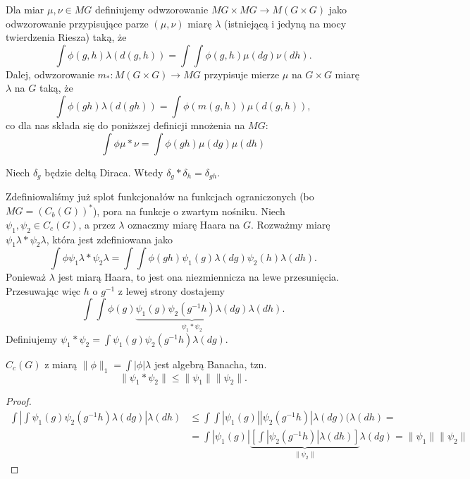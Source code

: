 Dla miar $\mu,\nu\in MG$ definiujemy odwzorowanie $MG\times MG\to M(G\times G)$ jako odwzorowanie przypisujące parze $(\mu,\nu)$ miarę $\lambda$ (istniejącą i jedyną na mocy twierdzenia Riesza) taką, że
$$\int \phi(g,h) \lambda(d(g,h))=\int\int \phi(g, h)\mu(dg)\nu(dh).$$
Dalej, odwzorowanie $m_*:M(G\times G)\to MG$ przypisuje mierze $\mu$ na $G\times G$ miarę $\lambda$ na $G$ taką, że 
$$\int \phi(gh)\lambda(d(gh))=\int \phi(m(g,h))\mu(d(g,h)),$$
co dla nas składa się do poniższej definicji mnożenia na $MG$:
$$\int \phi\mu\ast\nu=\int \phi(gh)\mu(dg)\mu(dh)$$

\begin{example}
  Niech $\delta_g$ będzie deltą Diraca. Wtedy $\delta_g\ast\delta_h=\delta_{gh}$.
\end{example}

Zdefiniowaliśmy już splot funkcjonałów na funkcjach ograniczonych (bo $MG=(C_b(G))^*$), pora na funkcje o zwartym nośniku. Niech $\psi_1,\psi_2\in C_c(G)$, a przez $\lambda$ oznaczmy miarę Haara na $G$. Rozważmy miarę $\psi_1\lambda\ast\psi_2\lambda$, która jest zdefiniowana jako
$$\int\phi\psi_1\lambda\ast\psi_2\lambda=\int\int\phi(gh)\psi_1(g)\lambda(dg)\psi_2(h)\lambda(dh).$$
Ponieważ $\lambda$ jest miarą Haara, to jest ona niezmiennicza na lewe przesunięcia. Przesuwając więc $h$ o $g^{-1}$ z lewej strony dostajemy
$$\int\int\phi(g) \underbrace{\psi_1(g)\psi_2(g^{-1}h)\lambda(dg)}_{\psi_1\ast\psi_2}\lambda(dh).$$
Definiujemy $\psi_1\ast\psi_2=\int \psi_1(g)\psi_2(g^{-1}h)\lambda(dg)$.

\begin{lemma}{}{}
  $C_c(G)$ z miarą $\|\phi\|_1=\int|\phi|\lambda$ jest algebrą Banacha, tzn.
  $$\|\psi_1\ast\psi_2\|\leq\|\psi_1\|\|\psi_2\|.$$
\end{lemma}

\begin{proof}
  \begin{align*}
    \int \left|\int\psi_1(g)\psi_2(g^{-1}h)\lambda(dg)\right|\lambda(dh)&\leq \int\int\left|\psi_1(g)\right|\left|\psi_2(g^{-1}h)\right|\lambda(dg)(\lambda(dh)=\\ 
                                                                        &=\int\left|\psi_1(g)\right|\underbrace{\left[\int\left|\psi_2(g^{-1}h)\right|\lambda(dh)\right]}_{\|\psi_2\|}\lambda(dg)=\|\psi_1\|\|\psi_2\|
  \end{align*}
\end{proof}








